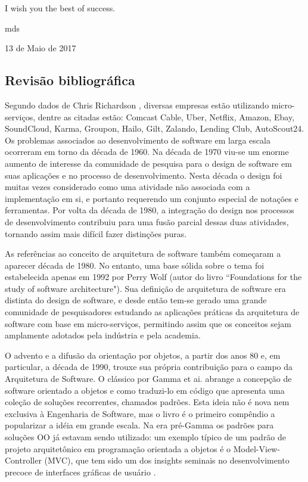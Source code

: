 \documentclass[journal]{IEEEtran}
\begin{document}
I wish you the best of success.

\hfill mds
 
\hfill 13 de Maio de 2017

\subsection{Revisão bibliográfica}

Segundo dados de Chris Richardson \cite{ChrisRichardson}, diversas empresas estão utilizando micro-serviços, dentre as citadas estão: Comcast Cable, Uber, Netflix, Amazon, Ebay, SoundCloud, Karma, Groupon, Hailo, Gilt, Zalando, Lending Club, AutoScout24.
Os problemas associados ao desenvolvimento de software em larga escala ocorreram em torno da década de 1960. Na década de 1970 viu-se um enorme aumento de interesse da comunidade de pesquisa para o design de software em suas aplicações e  no processo de desenvolvimento. Nesta década o design foi muitas vezes considerado como uma atividade não associada com a implementação em si, e portanto requerendo um conjunto especial de notações e ferramentas. Por volta da década de 1980, a integração do design nos processos de desenvolvimento contribuiu para uma fusão parcial dessas duas atividades, tornando assim mais difícil fazer distinções puras.

As referências ao conceito de arquitetura de software também começaram a aparecer década de 1980. No entanto, uma base sólida sobre o tema foi estabelecida apenas em 1992 por Perry Wolf (autor do livro “Foundations for the study of software architecture"). Sua definição de arquitetura de software era distinta do design de software, e desde então tem-se gerado uma grande comunidade de pesquisadores estudando as aplicações práticas da arquitetura de software com base em micro-serviços, permitindo  assim que os conceitos sejam amplamente adotados pela indústria e pela academia.

O advento e a difusão da orientação por objetos, a partir dos anos 80 e, em particular, a década de 1990, trouxe sua própria contribuição para o campo da Arquitetura de Software. O clássico por Gamma et ai. abrange a concepção de software orientado a objetos e como traduzi-lo em código que apresenta uma coleção de soluções recorrentes, chamados padrões. Esta ideia não é nova nem exclusiva à Engenharia de Software, mas o livro é o primeiro compêndio a popularizar a idéia em grande escala. Na era pré-Gamma os padrões para soluções OO já estavam sendo utilizado: um exemplo típico de um padrão de projeto arquitetônico em programação orientada a objetos é o Model-View-Controller (MVC), que tem sido um dos insights seminais no desenvolvimento precoce de interfaces gráficas de usuário \cite{nicoladragonietal}.
\end{document}
